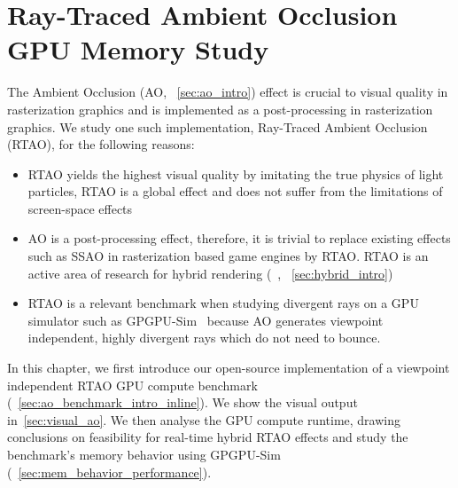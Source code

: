 
\chapter{Ray-Traced Ambient Occlusion GPU Memory Study}
\label{ch:ao}

The Ambient Occlusion (AO, ~\autoref{sec:ao_intro}) effect is crucial to visual quality in rasterization graphics and is implemented as a post-processing in rasterization graphics. We study one such implementation, Ray-Traced Ambient Occlusion (RTAO), for the following reasons:
\begin{itemize}
\item RTAO yields the highest visual quality by imitating the true physics of light particles, RTAO is a global effect and does not suffer from the limitations of screen-space effects
\item AO is a post-processing effect, therefore, it is trivial to replace existing effects such as SSAO in rasterization based game engines by RTAO. RTAO is an active area of research for hybrid rendering (~\cite{Barre_Brisebois2019}, ~\autoref{sec:hybrid_intro})
\item RTAO is a relevant benchmark when studying divergent rays on a GPU simulator such as GPGPU-Sim~\cite{4919648} because AO generates viewpoint independent, highly divergent rays which do not need to bounce.
\end{itemize}

In this chapter, we first introduce our open-source implementation of a viewpoint independent RTAO GPU compute benchmark (~\autoref{sec:ao_benchmark_intro_inline}). We show the visual output in~\autoref{sec:visual_ao}. We then analyse the GPU compute runtime, drawing conclusions on feasibility for real-time hybrid RTAO effects and study the benchmark's memory behavior using GPGPU-Sim (~\autoref{sec:mem_behavior_performance}). 

